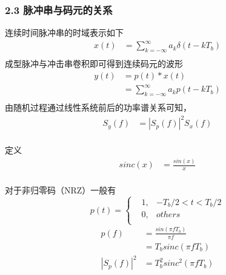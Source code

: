 \documentclass[
]{article}
\begin{document}
\hypertarget{header-n23}{%
\subsubsection{2.3 脉冲串与码元的关系}\label{header-n23}}
连续时间脉冲串的时域表示如下
\begin{equation}
\begin{aligned}
x(t) &= \sum\limits_{k=-\infty}^{\infty} a_k \delta(t-kT_b) \\
\end{aligned}
\end{equation}
成型脉冲与冲击串卷积即可得到连续码元的波形\\
\begin{equation}
\begin{aligned}
y(t) &= p(t) \ast x(t) \\
&= \sum\limits_{k=-\infty}^{\infty} a_k p(t-kT_b) \\
\end{aligned}
\end{equation}
由随机过程通过线性系统前后的功率谱关系可知，
\begin{equation}
\begin{aligned}
S_y(f) &= 	{\left| S_p(f) \right|}^2 S_x(f) \\
\end{aligned}
\end{equation}

定义\\
\begin{equation}
\begin{aligned}
sinc(x) &= \frac{sin(x)}{x} \\
\end{aligned}
\end{equation}



对于非归零码（NRZ）一般有
\begin{equation}
p(t) =\left\{
\begin{aligned}
&1, & -T_b/2 < t < T_b/2\\
&0, & others \\
\end{aligned}
\right.
\end{equation}
\begin{equation}
\begin{aligned}
p(f) &= \frac{sin(\pi f T_b)}{\pi f}\\
&=  T_b sinc(\pi f T_b)\\
{\left| S_p(f) \right|}^2 & = T_b^2 sinc^2(\pi f T_b)
\end{aligned}
\end{equation}
\end{document}
